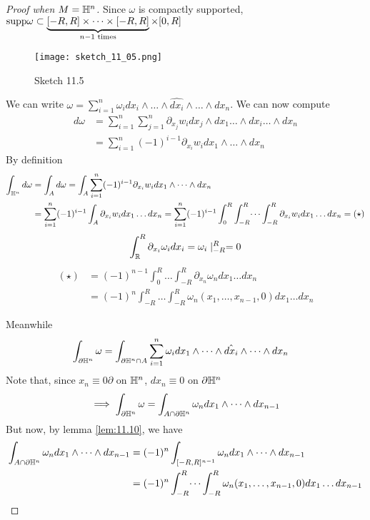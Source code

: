 \begin{proof}[Proof when \(M=\mathbb{H}^n\)]
Since \(\omega\) is compactly supported, \(\text{supp} \omega\subset \underbrace{[-R,R]\times\dots\times  [-R,R]}_{n-1\text{ times}}\times [0,R]\) 
\begin{figure}[H]\label{fig:11.5}
    \centering
    \texttt{[image: sketch\_11\_05.png]}
    \caption{Sketch 11.5}
\end{figure}   
We can write \(\omega=\sum_{i=1}^n\omega_i dx_i\wedge \dots \wedge \hat{dx_i}\wedge \dots \wedge dx_n\).
We can now compute 
\begin{align*}
    d\omega&=\sum_{i=1}^n\sum_{j=1}^n \partial_{x_j} w_i dx_j\wedge dx_1\dots\wedge dx_i\dots \wedge dx_n\\
    &=\sum_{i=1}^n(-1)^{i-1}\partial_{x_i}w_i dx_1\wedge \dots\wedge dx_n
\end{align*}
By definition 
\begin{align*}
    \int_{\mathbb{H}^n} d\omega &=\int_{A} d\omega=\int_A \sum_{i=1}^n(-1)^{i-1}\partial_{x_i}w_i dx_1\wedge \dots\wedge dx_n\\
    &= \sum_{i=1}^{n} (-1)^{i-1}\int_A \partial_{x_i}w_i dx_1\dots dx_n=\sum_{i=1}^n (-1)^{i-1}\int_0^R\int_{-R}^R\dots \int_{-R}^R\partial_{x_i}w_i dx_1\dots dx_n =(\star)
\end{align*}
 \[\int_{\mathbb{R}}^R \partial_{x_i}\omega_i dx_i=\omega_i\mid_{-R}^R=0\] 
\begin{align*}
    (\star) &= (-1)^{n-1} \int_0^R\dots\int_{-R}^R \partial_{x_n}\omega_n dx_1\dots dx_n\\
    &=(-1)^n\int_{-R}^R\dots \int_{-R}^R \omega_n(x_1,\dots,x_{n-1},0) dx_1\dots dx_n
\end{align*}

Meanwhile 
\begin{align*}
    \int_{\partial \mathbb{H}^n}\omega&=\int_{\partial \mathbb{H}^n\cap A}\sum_{i=1}^n\omega_i dx_1\wedge \dots\wedge \hat{dx_i}\wedge \dots \wedge dx_n
\end{align*}
Note that, since \(x_n\equiv 0\partial\) on \(\mathbb{H}^n\), \(dx_n\equiv 0\) on \(\partial \mathbb{H}^n\)
\begin{align*}
    \implies \int_{\partial \mathbb{H}^n}\omega=\int_{A\cap \partial \mathbb{H}^n}\omega_n dx_1\wedge \dots\wedge  dx_{n-1} 
\end{align*}
But now, by lemma \ref{lem:11.10}, we have 
\begin{align*}
    \int_{A\cap \partial \mathbb{H}^n} \omega_n dx_1\wedge \dots \wedge dx_{n-1}&=(-1)^n \int_{[-R,R]^{n-1}}\omega_ndx_1\wedge \dots \wedge dx_{n-1}\\
    &= (-1)^n \int_{-R}^R\dots \int_{-R}^R \omega_n (x_1,\dots,x_{n-1},0)dx_1\dots dx_{n-1}
\end{align*} 
\end{proof}

